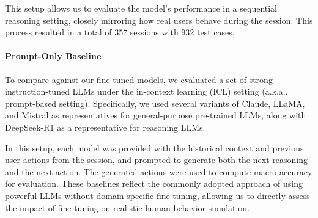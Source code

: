 \documentclass[11pt]{article}
\begin{document}
This setup allows us to evaluate the model's performance in a sequential reasoning setting, closely mirroring how real users behave during the session. This process resulted in a total of 357 sessions with 932 test cases.

\paragraph{Prompt-Only Baseline}
To compare against our fine-tuned models, we evaluated a set of strong instruction-tuned LLMs under the in-context learning (ICL) setting (a.k.a., prompt-based setting). Specifically, we used several variants of Claude, LLaMA, and Mistral as representatives for general-purpose pre-trained LLMs, along with DeepSeek-R1 as a representative for reasoning LLMs.

In this setup, each model was provided with the historical context and previous user actions from the session, and prompted to generate both the next reasoning and the next action.
The generated actions were used to compute macro accuracy for evaluation. 
These baselines reflect the commonly adopted approach of using powerful LLMs without domain-specific fine-tuning, allowing us to directly assess the impact of fine-tuning on realistic human behavior simulation.
\end{document}
